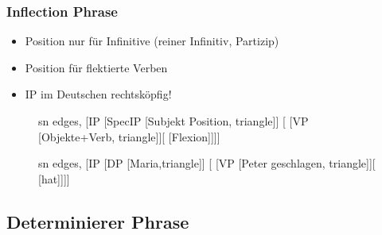 \begin{frame}
\frametitle{Inflection Phrase}

	\begin{itemize}
		\item {} \ras Position nur für Infinitive (reiner Infinitiv, Partizip)
		\item {} \ras Position für flektierte Verben
		\item IP im Deutschen \ras rechtsköpfig!		
	\end{itemize}


\begin{figure}[b]
  	\begin{minipage}[b]{0.45\textwidth}
	\centering
	\footnotesize{
		\begin{forest}
		sn edges,
		[IP [SpecIP [Subjekt Position, triangle]]
					[ [VP [Objekte+Verb, triangle]][ [Flexion]]]]
		\end{forest}
		}
  	\end{minipage}  
	\begin{minipage}[b]{0.45\textwidth}
	\centering
	\footnotesize{
		\begin{forest}
		sn edges,
		[IP [DP [Maria,triangle]]
					[ [VP [Peter geschlagen, triangle]][\zerobar{I} [hat]]]]
		\end{forest}
		}
  	\end{minipage}  
\end{figure}

\end{frame}


\subsection{Determinierer Phrase}

